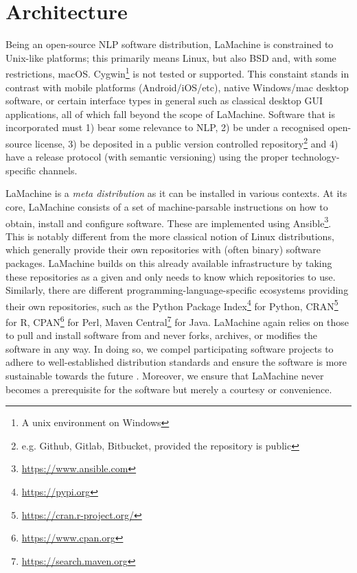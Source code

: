 \documentclass[a4paper,11pt]{article}
\begin{document}
\section{Architecture}

Being an open-source NLP software distribution, LaMachine is constrained to Unix-like platforms; this primarily means
Linux, but also BSD and, with some restrictions, macOS. Cygwin\footnote{A unix environment on Windows} is not tested or
supported. This constaint stands in contrast with mobile platforms (Android/iOS/etc), native Windows/mac desktop software, or
certain interface types in general such as classical desktop GUI applications, all of which fall beyond the scope of
LaMachine. Software that is incorporated must 1) bear some relevance to NLP, 2) be under a recognised open-source
license, 3) be deposited in a public version controlled repository\footnote{e.g. Github, Gitlab, Bitbucket, provided the
repository is public} and 4) have
a release protocol (with semantic versioning) using the proper technology-specific channels.

LaMachine is a \emph{meta distribution} as it can be installed in various contexts. At its core, LaMachine consists of a
set of machine-parsable instructions on how to obtain, install and configure software. These are implemented using
Ansible\footnote{\url{https://www.ansible.com}}.  This is notably different from the more classical notion of Linux
distributions, which generally provide their own repositories with (often binary) software packages. LaMachine builds on
this already available infrastructure by taking these repositories as a given and only needs to know which
repositories to use.  Similarly, there are different programming-language-specific ecosystems providing their own
repositories, such as the Python Package Index\footnote{\url{https://pypi.org}} for Python,
CRAN\footnote{\url{https://cran.r-project.org/}} for R, CPAN\footnote{\url{https://www.cpan.org}} for Perl, Maven
Central\footnote{\url{https://search.maven.org}} for Java.  LaMachine again relies on those to pull and install
software from and never forks, archives, or modifies the software in any way. In doing so, we compel participating
software projects to adhere to well-established distribution standards and ensure the software is more sustainable
towards the future \cite{softwarequality}. Moreover, we ensure that LaMachine never becomes a prerequisite for the software but merely a
courtesy or convenience.
\end{document}
